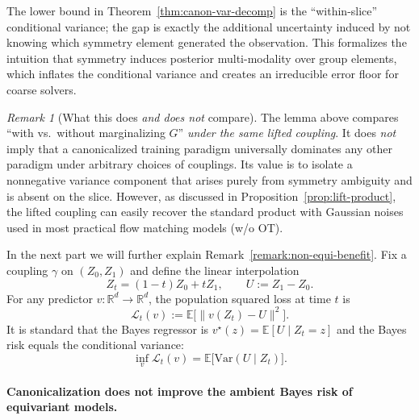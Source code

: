 \documentclass{article}
\theoremstyle{plain}
\theoremstyle{definition}
\theoremstyle{remark}
\newtheorem{remark}[theorem]{Remark}
\newcommand{\1}{\mathbf{1}}
\begin{document}
The lower bound in Theorem~\ref{thm:canon-var-decomp} is the ``within-slice'' conditional variance; the gap is exactly the additional uncertainty induced by not knowing which symmetry element generated the observation. This formalizes the intuition that symmetry induces posterior multi-modality over group elements, which inflates the conditional variance and creates an irreducible error floor for coarse solvers.

\begin{remark}[What this does \emph{and does not} compare]
The lemma above compares ``with vs.\ without marginalizing $G$'' \emph{under the same lifted coupling}.
It does \emph{not} imply that a canonicalized training paradigm universally dominates any other paradigm under arbitrary choices of couplings. Its value is to isolate a nonnegative variance component that arises purely from symmetry ambiguity and is absent on the slice. However, as discussed in Proposition~\ref{prop:lift-product}, the lifted coupling can easily recover the standard product with Gaussian noises used in most practical flow matching models (w/o OT).
\end{remark}

In the next part we will further explain Remark~\ref{remark:non-equi-benefit}.
Fix a coupling $\gamma$ on $(Z_0,Z_1)$ and define the linear interpolation
\begin{equation}
Z_t=(1-t)Z_0+tZ_1,\qquad U:=Z_1-Z_0.
\end{equation}
For any predictor $v:\mathbb R^d\to\mathbb R^d$, the population squared loss at time $t$ is
\begin{equation}
\mathcal L_t(v):=\mathbb E\big[\|v(Z_t)-U\|^2\big].
\end{equation}
It is standard that the Bayes regressor is $v^\star(z)=\mathbb E[U\mid Z_t=z]$ and the Bayes risk equals the
conditional variance:
\begin{equation}
\inf_v \mathcal L_t(v)=\mathbb E\big[\mathrm{Var}(U\mid Z_t)\big].
\label{eq:bayes-risk-ambient}
\end{equation}

\paragraph{Canonicalization does not improve the ambient Bayes risk of equivariant models.}
\label{para:eq-no-gain-ambient}
\end{document}
